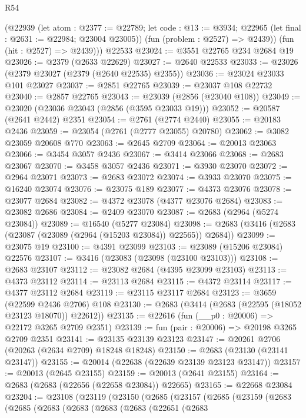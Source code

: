 \begin{lexlean}{R54}
\begin{coremodule}
        (@22939
          (let atom : @2377 := @22789;
          let code : @13 := @3934; @22965 (let final : @2631 := @22984; @23004 @23005))
          (fun (problem : @2527) => @2439))
        (fun (hit : @2527) => @2439)))
    @22533
@23024 := @3551 @22765 @234 @2684 @19
@23026 := @2379 (@2633 @22629)
@23027 := @2640 @22533
@23033 := @23026 (@2379 @23027 (@2379 (@2640 @22535) @2355))
@23036 := @23024 @23033 @101 @23027
@23037 := @2851 @22765
@23039 := @23037 @108 @22732
@23040 := @2857 @22765
@23043 := @23039 (@2856 (@23040 @108))
@23049 := @23020 (@23036 @23043 (@2856 (@3595 @23033 @19)))
@23052 := @20587 (@2641 @2442) @2351
@23054 := @2761 (@2774 @2440)
@23055 := @20183 @2436
@23059 := @23054 (@2761 (@2777 @23055) @20780)
@23062 := @3082 @23059 @20608 @770
@23063 := @2645 @2709
@23064 := @20013 @23063
@23066 := @3454 @3057 @2436
@23067 := @3414 @23066
@23068 := @2683 @23067
@23070 := @3458 @3057 @2436
@23071 := @3930 @23070
@23072 := @2964 @23071
@23073 := @2683 @23072
@23074 := @3933 @23070
@23075 := @16240 @23074
@23076 := @23075 @189
@23077 := @4373 @23076
@23078 := @23077 @2684
@23082 := @4372 @23078 (@4377 @23076 @2684)
@23083 := @23082 @2686
@23084 := @2409 @23070
@23087 := @2683 (@2964 (@5274 @23084))
@23089 := @16540 (@5277 @23084)
@23098 := @2683 (@3416 (@2683 (@23087 (@23089 (@2964 (@15203 @23084)) @22565)) @2684))
@23099 := @23075 @19
@23100 := @4391 @23099
@23103 := @23089 (@15206 @23084) @22576
@23107 := @3416 (@23083 (@23098 (@23100 @23103)))
@23108 := @2683 @23107
@23112 := @23082 @2684 (@4395 @23099 @23103)
@23113 := @4373 @23112
@23114 := @23113 @2684
@23115 := @4372 @23114
@23117 := @4377 @23112 @2684
@23119 := @23115 @23117 @2684
@23123 := @3659 (@22599 @2436 @2706) @108
@23130 := @2683 (@3414 (@2683 (@22595 (@18052 @23123 @18070)) @22612))
@23135 := @22616 (fun (__p0 : @20006) => @22172 @3265 @2709 @2351)
@23139 := fun (pair : @20006) => @20198 @3265 @2709 @2351
@23141 := @23135 @23139 @23123
@23147 := @20261 @2706 (@20263 (@2634 @2709) @18248 @18248)
@23150 := @2683 (@23130 (@23141 @23147))
@23155 := @20014 (@22638 (@22639 @23139 @23123 @23147))
@23157 := @20013 (@2645 @23155)
@23159 := @20013 (@2641 @23155)
@23164 := @2683 (@2683 (@22656 (@22658 @23084)) @22665)
@23165 := @22668 @23084
@23204 := @23108
    (@23119
      (@23150
        (@2685
          (@23157
            (@2685
              (@23159
                (@2683
                  (@2685
                    (@2683
                      (@2683
                        (@2683
                          (@2683
                            (@22651
                              (@2683

\end{coremodule}
\end{lexlean}
